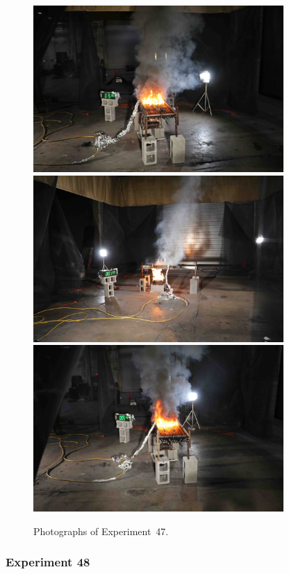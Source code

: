 \begin{figure}[p]
\centering
\includegraphics[height=2.50in]{../FIGURES/Test_47_setup} \\
\includegraphics[height=2.50in]{../FIGURES/Test_47_ignition} \\
\includegraphics[height=2.50in]{../FIGURES/Test_47_burning}
\caption[Photographs of Experiment~47]{Photographs of Experiment~47.}
\label{fig:Test_47_photos}
\end{figure}


\clearpage

\subsubsection{Experiment 48}

